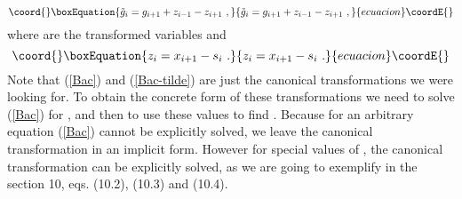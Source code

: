 \documentclass[a4paper,11pt]{article}
\begin{document}
\begin{equation}\coord{}\boxEquation{
\label{Bac-tilde}
    {\tilde g}_i=g_{i+1}+z_{i-1}-z_{i+1} ~,
}{
{\tilde g}_i=g_{i+1}+z_{i-1}-z_{i+1} ~,
}{ecuacion}\coordE{}\end{equation}
where \coordHE{} are the transformed variables and
\begin{equation}\coord{}\boxEquation{
\label{z}
 z_i=x_{i+1}-s_i ~.
}{
z_i=x_{i+1}-s_i ~.
}{ecuacion}\coordE{}\end{equation} Note that (\ref{Bac}) and (\ref{Bac-tilde}) are just the
canonical transformations we were looking for. To obtain the
concrete form of these transformations we need to solve
(\ref{Bac}) for \coordHE{}, and then to use these values to find
\coordHE{}. Because for an arbitrary \myHighlight{$\lambda$}\coordHE{} equation
(\ref{Bac}) cannot be explicitly solved, we leave the canonical
transformation in an implicit form. However for special values of
\myHighlight{$\lambda$}\coordHE{}, the canonical transformation can be explicitly solved,
as we are going to exemplify in the section 10, eqs. (10.2),
(10.3) and (10.4).
\end{document}
